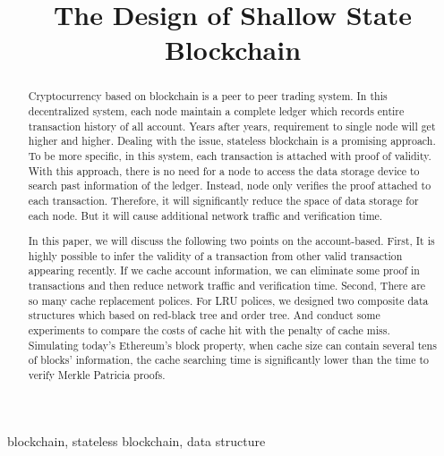 \documentclass[conference]{IEEEtran}
\begin{document}
\title{The Design of Shallow State Blockchain}

\author{
}

\maketitle

\begin{abstract}
Cryptocurrency based on blockchain is a peer to peer trading
system. In this decentralized system,
each node maintain a complete ledger which
records entire transaction history of all account.
Years after years, requirement to single node will
get higher and higher. Dealing with the issue, stateless
blockchain is a promising approach. To be more specific,
in this system, each transaction is attached with proof
of validity. With this approach, there is no need for a node
to access the data storage device to search past information
of the ledger. Instead, node only verifies the proof attached
to each transaction. Therefore, it will significantly
reduce the space of data storage for each node.
But it will cause additional network traffic and
verification time.

In this paper, we will discuss the following two points
on the account-based.
First,
It is highly possible to infer the validity of
a transaction from other valid transaction appearing recently.
If we cache account information, we can eliminate some
proof in transactions and then reduce network traffic
and verification time.
Second,
There are so many cache replacement polices.
For LRU polices, we designed two composite data
structures which based on red-black tree and order tree.
And conduct some experiments to compare the costs of
cache hit with the penalty of cache miss.
Simulating today's Ethereum's block property,
when cache size can contain several tens of blocks' information,
the cache searching time is significantly lower than
the time to verify Merkle Patricia proofs.
\end{abstract}

\begin{IEEEkeywords}
blockchain, stateless blockchain, data structure
\end{IEEEkeywords}
\end{document}
